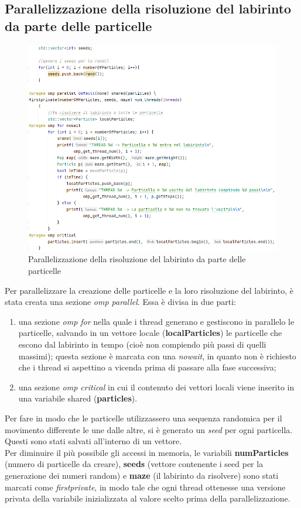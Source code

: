 \documentclass[10pt,twocolumn,letterpaper]{article}
\begin{document}
\subsection{Parallelizzazione della risoluzione del labirinto da parte delle particelle}
\begin{figure}[H]
\includegraphics[width=1\linewidth]{code/par1.png}
\caption{\small Parallelizzazione della risoluzione del labirinto da parte delle particelle}
\label{par1}
\end{figure}
Per parallelizzare la creazione delle particelle e la loro risoluzione del labirinto, è stata creata una sezione \textit{omp parallel}. Essa è divisa in due parti:
\begin{enumerate}
\item{una sezione \textit{omp for} nella quale i thread generano e gestiscono in parallelo le particelle, salvando in un vettore locale (\textbf{localParticles}) le particelle che escono dal labirinto in tempo (cioè non compiendo più passi di quelli massimi); questa sezione è marcata con una \textit{nowait}, in quanto non è richiesto che i thread si aspettino a vicenda prima di passare alla fase successiva;}
\item{una sezione \textit{omp critical} in cui il contenuto dei vettori locali viene inserito in una variabile shared (\textbf{particles}).}
\end{enumerate}
Per fare in modo che le particelle utilizzassero una sequenza randomica per il movimento differente le une dalle altre, si è generato un \textit{seed} per ogni particella. Questi sono stati salvati all'interno di un vettore.\\
Per diminuire il più possibile gli accessi in memoria, le variabili \textbf{numParticles} (numero di particelle da creare), \textbf{seeds} (vettore contenente i seed per la generazione dei numeri random) e \textbf{maze} (il labirinto da risolvere) sono stati marcati come \textit{firstprivate}, in modo tale che ogni thread ottenesse una versione privata della variabile inizializzata al valore scelto prima della parallelizzazione.
\end{document}

